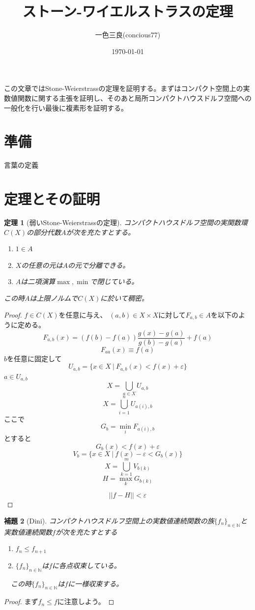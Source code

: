 \documentclass{jsarticle}
\title{ストーン-ワイエルストラスの定理}
\author{一色三良(concious77)}
\date{\today}
\newtheorem{thm}{定理}
\newtheorem{lem}[thm]{補題}
\begin{document}
\maketitle

この文章ではStone-Weierstrassの定理を証明する。まずはコンパクト空間上の実数値関数に関する主張を証明し、そのあと局所コンパクトハウスドルフ空間への一般化を行い最後に複素形を証明する。


\section*{準備}
言葉の定義


\section{定理とその証明}



 \begin{thm}[弱いStone-Weierstrassの定理]
コンパクトハウスドルフ空間の実関数環$C(X)$の部分代数$A$が次を充たすとする。


  \begin{enumerate}
   \item $1\in A$
   \item $X$の任意の元は$A$の元で分離できる。
　　\item $A$は二項演算$\max,\min$で閉じている。
  \end{enumerate}


この時$A$は上限ノルムで$C(X)$に於いて稠密。
\end{thm}
\begin{proof}$f\in C(X)$を任意に与え、
$(a,b)\in X\times X$に対して$F_{a,b}\in A$を以下のように定める。
\[
F_{a,b}(x)=(f(b)-f(a))\frac{g(x)-g(a)}{g(b)-g(a)}+f(a)
\]
\[
F_{aa}(x)\equiv f(a)
\]
$b$を任意に固定して
\[
U_{a,b}=\{x\in X\ |\ F_{a,b}(x)<f(x)+\varepsilon\}
\]
$a\in U_{a,b}$
\[
X=\bigcup_{a\in X}U_{a,b}
\]
\[
X=\bigcup_{i=1}^n U_{a(i),b}
\]
ここで
\[
G_b=\min_{i}F_{a(i),b}
\]とすると
\[
G_b(x)<f(x)+\varepsilon
\]
\[
V_b=\{x\in X\ |\ f(x)-\varepsilon <G_b(x)\}
\]
\[
X=\bigcup_{k=1}^m V_{b(k)}
\]
\[
H=\max_{k}G_{b(k)}
\]

\[
||f-H||<\varepsilon
\]
\end{proof}



\begin{lem}[Dini]

コンパクトハウスドルフ空間上の実数値連続関数の族$\{f_{n}\}_{n\in \mathbb{N}}$と実数値連続関数$f$が次を充たすとする

  \begin{enumerate}
    \item $f_{n}\le f_{n+1}$
  \item $\{f_{n}\}_{n\in \mathbb{N}}$は$f$に各点収束している。
  \end{enumerate}
　この時$\{f_{n}\}_{n\in \mathbb{N}}$は$f$に一様収束する。
\end{lem}
\begin{proof}
まず$f_n\le f$に注意しよう。
\end{proof}
\end{document}
